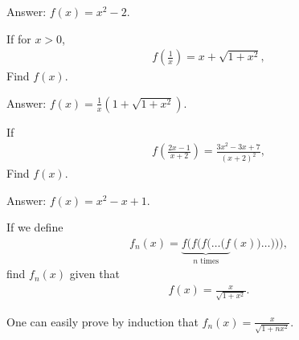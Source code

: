 \documentclass[12pt,a4paper]{memoir}
\theoremstyle{definition}
\begin{document}
\begin{solution}[name=Solution by Parviz Shahriari]
	Answer: $f(x)=x^2-2$.
\end{solution}



\begin{tcolorbox}
	\begin{question}
		If for $x >0$,
		\begin{align*}
			f\left(\frac{1}{x}\right)= x+ \sqrt{1+x^2},
		\end{align*}
		Find $f(x)$.
	\end{question}
\end{tcolorbox}

\begin{solution}[name=Solution by Parviz Shahriari]
	Answer: $f(x)=\frac{1}{x}\left(1+\sqrt{1+x^2}\right)$.
\end{solution}



\begin{tcolorbox}
	\begin{question}
		If
		\begin{align*}
			f\left(\frac{2x-1}{x+2}\right)= \frac{3x^2-3x+7}{(x+2)^2},
		\end{align*}
		Find $f(x)$.
	\end{question}
\end{tcolorbox}

\begin{solution}[name=Solution by Parviz Shahriari]
	Answer: $f(x)=x^2-x+1$.
\end{solution}

\begin{tcolorbox}
	\begin{question}
		If we define
		\begin{align*}
			f_n(x)= \underbrace{f(f(f(\dots(f}_{n \text{ times}}(x))\dots))),
		\end{align*}
		find $f_n(x)$ given that
		\begin{align*}
			f(x)=\frac{x}{\sqrt{1+x^2}}.
		\end{align*}
	\end{question}
\end{tcolorbox}

\begin{solution}[name=Solution by Parviz Shahriari]
	One can easily prove by induction that $f_n(x)=\frac{x}{\sqrt{1+nx^2}}$.
\end{solution}
\end{document}

